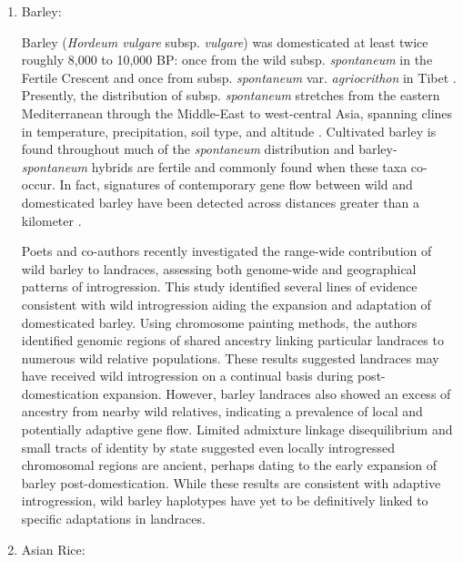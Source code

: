 \documentclass[11pt]{article}
\begin{document}
\begin{enumerate}
\item{Barley:}
		
Barley (\emph{Hordeum vulgare} subsp. \emph{vulgare}) was domesticated at least twice roughly 8,000 to 10,000 BP: once from the wild subsp. \emph{spontaneum} in the Fertile Crescent and once from subsp. \emph{spontaneum} var. \emph{agriocrithon} in Tibet \cite{takahashi1955origin, badr2000origin, azhaguvel2007phylogenetic, haberer2015barley, ren2013tibet, dai2012tibet}.
Presently, the distribution of subsp. \emph{spontaneum} stretches from the eastern Mediterranean through the Middle-East to west-central Asia, spanning clines in temperature, precipitation, soil type, and altitude \cite{nevo2010drought}.
Cultivated barley is found throughout much of the \emph{spontaneum} distribution and barley-\emph{spontaneum} hybrids are fertile and commonly found when these taxa co-occur.
In fact, signatures of contemporary gene flow between wild and domesticated barley have been detected across distances greater than a kilometer \cite{hillman2001new}.


Poets and co-authors \cite{Poets2015} recently investigated the range-wide contribution of wild barley to landraces, assessing both genome-wide and geographical patterns of introgression.
This study identified several lines of evidence consistent with wild introgression aiding the expansion and adaptation of domesticated barley.
Using chromosome painting methods, the authors identified genomic regions of shared ancestry linking particular landraces to numerous wild relative populations.
These results suggested landraces may have received wild introgression on a continual basis during post-domestication expansion.
However, barley landraces also showed an excess of ancestry from nearby wild relatives, indicating a prevalence of local and potentially adaptive gene flow.
Limited admixture linkage disequilibrium and small tracts of identity by state suggested even locally introgressed chromosomal regions are ancient, perhaps dating to the early expansion of barley  post-domestication.
While these results are consistent with adaptive introgression, wild barley haplotypes have yet to be definitively linked to specific adaptations in landraces.


\item{Asian Rice:}


\end{enumerate}
\end{document}
